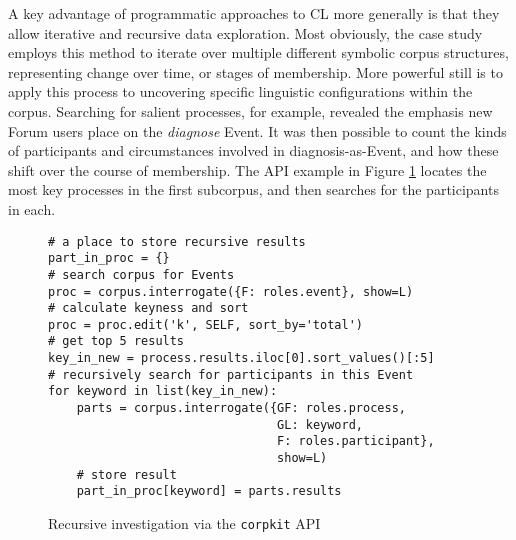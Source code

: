 A key advantage of programmatic approaches to \gls{CL} more generally is that they allow iterative and recursive data exploration. Most obviously, the case study employs this method to iterate over multiple different symbolic \gls{corpus} structures, representing change over time, or stages of membership. More powerful still is to apply this process to uncovering specific linguistic configurations within the \gls{corpus}. Searching for salient processes, for example, revealed the emphasis new \gls{Forum} users place on the \emph{diagnose} Event. It was then possible to count the kinds of participants and circumstances involved in diagnosis\hyp{}as\hyp{}Event, and how these shift over the course of membership. The \gls{API} example in Figure \ref{fig:recursive-code} locates the most key processes in the first subcorpus, and then searches for the participants in each.

\begin{figure}[htb]
\begin{verbatim}
# a place to store recursive results
part_in_proc = {}
# search corpus for Events
proc = corpus.interrogate({F: roles.event}, show=L)
# calculate keyness and sort
proc = proc.edit('k', SELF, sort_by='total')
# get top 5 results
key_in_new = process.results.iloc[0].sort_values()[:5]
# recursively search for participants in this Event
for keyword in list(key_in_new):
    parts = corpus.interrogate({GF: roles.process,
                                GL: keyword,
                                F: roles.participant},
                                show=L)
    # store result
    part_in_proc[keyword] = parts.results
\end{verbatim}
\caption[Recursive corpus investigation]{Recursive investigation via the \texttt{corpkit} API}
\label{fig:recursive-code}
\end{figure}
%


